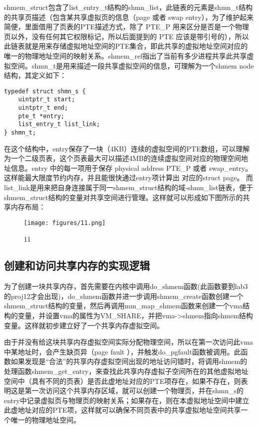 shmem\_struct包含了list\_entry\_t结构的shmn\_list，此链表的元素是shmn\_t结构的共享页描述（包含某共享虚拟页的信息（page
或者 swap entry），为了维护起来简便，里面借用了页表的PTE描述方式，除了
PTE\_P
用来区分是否是一个物理页以外，没有任何其它权限标记，所以后面提到的 PTE
应该是带引号的），所以此链表就是用来存储虚拟地址空间的PTE集合，即此共享的虚拟地址空间对应的唯一的物理地址空间的映射关系。shmem\_ref指出了当前有多少进程共享此共享虚拟空间。shmn\_t是用来描述一段共享虚拟空间的信息，可理解为一个shmem
node结构，其定义如下：

\begin{lstlisting}
typedef struct shmn_s {
    uintptr_t start;
    uintptr_t end;
    pte_t *entry;
    list_entry_t list_link;
} shmn_t;
\end{lstlisting}

在这个结构中，entry保存了一块（4KB）连续的虚拟空间的PTE数组，可以理解为一个二级页表，这个页表最大可以描述4MB的连续虚拟空间对应的物理空间地址信息。entry
中的每一项用于保存 physical address \textbar{} PTE\_P 或者
swap\_entry。这样能最大限度节约内存，并且能很快通过entry项计算出
对应的struct page。
而list\_link是用来把自身连接属于同一shmem\_struct结构的域-shmn\_list链表，便于shmem\_struct结构的变量对共享空间进行管理。这样就可以形成如下图所示的共享内存布局：

\begin{figure}[htbp]
\centering
\texttt{[image: figures/11.png]}
\caption{11}
\end{figure}

\subsection{创建和访问共享内存的实现逻辑}\label{ux521bux5efaux548cux8bbfux95eeux5171ux4eabux5185ux5b58ux7684ux5b9eux73b0ux903bux8f91}

为了创建一块共享内存，首先需要在内核中调用do\_shmem函数(此函数要到lab3的proj12才会出现)，do\_shmem函数并进一步调用shmem\_create函数创建一个shmem\_struct结构的变量，然后再调用mm\_map\_shmem函数来创建一个vma结构的变量，并设置vma的属性为VM\_SHARE，并把vma-\textgreater{}shmem指向shmem结构变量。这样就初步建立好了一个共享内存虚拟空间。

由于并没有给这块共享内存虚拟空间实际分配物理空间，所以在第一次访问此vma中某地址时，会产生缺页异（page
fault
），并触发do\_pgfault函数被调用。此函数如果发现是``合法''的共享内存虚拟空间出现的地址访问错时，将调用shmem的处理函数shmem\_get\_entry，来查找此共享内存虚拟子空间所在的其他虚拟地址空间中（具有不同的页表）是否此虚地址对应的PTE项存在，如果不存在，则表明这是第一次访问这个共享内存区域，就可以创建一个物理页，并在shmn\_s的entry中记录虚拟页与物理页的映射关系；如果存在，则在本虚拟地址空间中建立此虚地址对应的PTE项，这样就可以确保不同页表中的共享虚拟地址空间共享一个唯一的物理地址空间。

